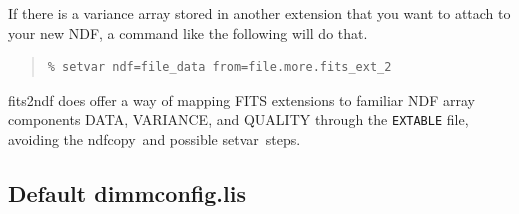 \documentclass[twoside,11pt]{article}
\newcommand{\xref}[3]{#1}
\newcommand{\xlabel}[1]{}
\renewcommand{\_}{\texttt{\symbol{95}}}
\newenvironment{myquote}{\begin{quote}\begin{small}}{\end{small}\end{quote}}
\newcommand{\task}[1]{\textsf{#1}}
\newcommand{\param}[1]{\texttt{#1}}
\newcommand{\ndfcopy}{\xref{\task{ndfcopy}}{sun95}{NDFCOPY}}
\newcommand{\setvar}{\xref{\task{setvar}}{sun95}{SETVAR}}
\begin{document}
If there is a variance array stored in another extension that you want
to attach to your new NDF, a command like the following will do that.

\begin{myquote}
\begin{verbatim}
% setvar ndf=file_data from=file.more.fits_ext_2
\end{verbatim}
\end{myquote}

\task{fits2ndf} does offer a way of mapping FITS extensions to familiar NDF
array components DATA, VARIANCE, and QUALITY through the \param{EXTABLE} file,
avoiding the \ndfcopy\ and possible \setvar\ steps.


\newpage
\subsection{\xlabel{defconfig}Default dimmconfig.lis}
\label{app:dimm}
\raggedbottom
\end{document}
